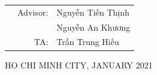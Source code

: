\documentclass[a4paper]{article}
\begin{document}
\begin{titlepage}
  \vspace{3cm}

  \begin{table}[h]
    \begin{tabular}{rrl}
      \hspace{5cm} & Advisor: & Nguyễn Tiến Thịnh \\
                   &          & Nguyễn An Khương  \\
                   & TA\@:    & Trần Trung Hiếu   \\
    \end{tabular}
  \end{table}

  \begin{center}
    {\footnotesize HO CHI MINH CITY, JANUARY 2021}
  \end{center}
\end{titlepage}



\newpage
\tableofcontents
\newpage


\end{document}
